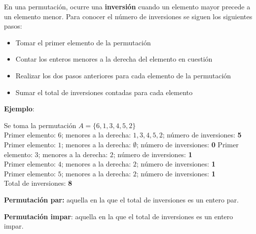 En una permutación, ocurre una \textbf{inversi\'on} cuando un elemento mayor
precede a un elemento menor. Para conocer el n\'umero de inversiones se siguen
los siguientes pasos:

\begin{itemize}
\item Tomar el primer elemento de la permutaci\'on
\item Contar los enteros menores a la derecha del elemento en cuesti\'on
\item Realizar los dos pasos anteriores para cada elemento de la permutaci\'on
\item Sumar el total de inversiones contadas para cada elemento
\end{itemize}

\textbf{Ejemplo}:

Se toma la permutación \textbf{$A=\{6,1,3,4,5,2\}$}\\

Primer elemento: $6$; menores a la derecha: $1,3,4,5,2$; n\'umero de
inversiones: \textbf{5}
Primer elemento: $1$; menores a la derecha: $\emptyset$; n\'umero de
inversiones: \textbf{0}
Primer elemento: $3$; menores a la derecha: $2$; n\'umero de inversiones:
\textbf{1}\\
Primer elemento: $4$; menores a la derecha: $2$; n\'umero de inversiones:
\textbf{1}\\
Primer elemento: $5$; menores a la derecha: $2$; n\'umero de inversiones:
\textbf{1}\\

Total de inversiones: \textbf{8}
\begin{tcolorbox}[colback=blue!5!white,colframe=blue!60!black,title=Definición: Tipos de permutaciones]
	\textbf{Permutaci\'on par:} aquella en la que el total de inversiones es un
	entero par.
	
	\tcblower

	\textbf{Permutaci\'on impar}: aquella en la que el total de inversiones es un
	entero impar.
	
\end{tcolorbox}

